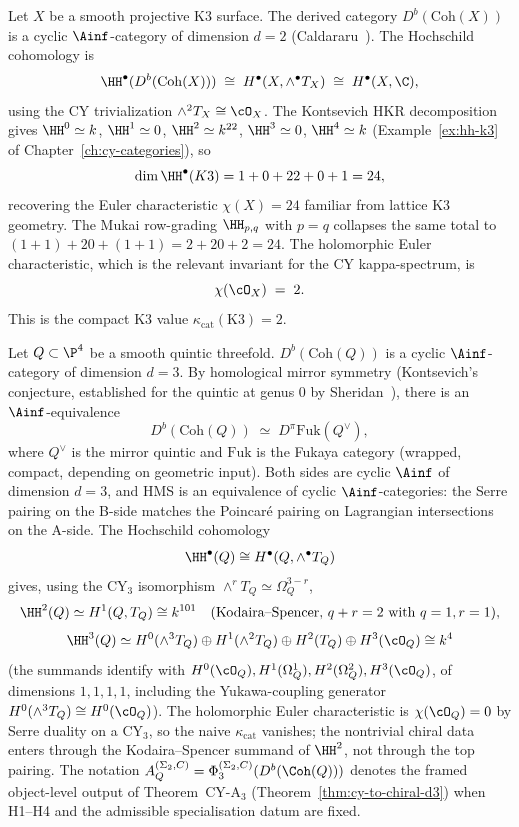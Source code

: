 \begin{example}[\texorpdfstring{$d = 2$}{d = 2} from K3]
\label{ex:cy2-k3}
Let $X$ be a smooth projective K3 surface. The derived category $D^b(\mathrm{Coh}(X))$ is a cyclic $\Ainf$-category of dimension $d = 2$ (Caldararu~\cite{Caldararu2005}). The Hochschild cohomology is
\[
 \HH^\bullet(D^b(\mathrm{Coh}(X))) \;\cong\; H^\bullet(X, \wedge^\bullet T_X) \;\cong\; H^\bullet(X, \C),
\]
using the CY trivialization $\wedge^2 T_X \cong \cO_X$. The Kontsevich HKR decomposition gives $\HH^0 \simeq k$, $\HH^1 \simeq 0$, $\HH^2 \simeq k^{22}$, $\HH^3 \simeq 0$, $\HH^4 \simeq k$ (Example~\ref{ex:hh-k3} of Chapter~\ref{ch:cy-categories}), so
\[
 \dim \HH^\bullet(K3) = 1 + 0 + 22 + 0 + 1 = 24,
\]
recovering the Euler characteristic $\chi(X) = 24$ familiar from lattice K3 geometry. The Mukai row-grading $\HH_{p,q}$ with $p = q$ collapses the same total to $(1+1) + 20 + (1+1) = 2 + 20 + 2 = 24$. The holomorphic Euler characteristic, which is the relevant invariant for the CY kappa-spectrum, is
\[
 \chi(\cO_X) \;=\; 2.
\]
This is the compact K3 value $\kappa_{\mathrm{cat}}(\mathrm{K3}) = 2$.
\end{example}

\begin{example}[\texorpdfstring{$d = 3$}{d = 3} from the quintic]
\label{ex:cy3-quintic}
Let $Q \subset \P^4$ be a smooth quintic threefold. $D^b(\mathrm{Coh}(Q))$ is a cyclic $\Ainf$-category of dimension $d = 3$. By homological mirror symmetry (Kontsevich's conjecture, established for the quintic at genus $0$ by Sheridan~\cite{Sheridan2015}), there is an $\Ainf$-equivalence
\[
 D^b(\mathrm{Coh}(Q)) \;\simeq\; D^\pi \mathrm{Fuk}(Q^\vee),
\]
where $Q^\vee$ is the mirror quintic and $\mathrm{Fuk}$ is the Fukaya category (wrapped, compact, depending on geometric input). Both sides are cyclic $\Ainf$ of dimension $d = 3$, and HMS is an equivalence of cyclic $\Ainf$-categories: the Serre pairing on the B-side matches the Poincar\'e pairing on Lagrangian intersections on the A-side. The Hochschild cohomology
\[
 \HH^\bullet(Q) \cong H^\bullet(Q, \wedge^\bullet T_Q)
\]
gives, using the CY$_3$ isomorphism $\wedge^r T_Q \simeq \Omega^{3-r}_Q$,
\[
 \HH^2(Q) \simeq H^1(Q, T_Q) \cong k^{101}
 \quad \text{(Kodaira--Spencer, $q+r = 2$ with $q=1,r=1$)},
\]
\[
 \HH^3(Q) \simeq H^0(\wedge^3 T_Q) \oplus H^1(\wedge^2 T_Q) \oplus H^2(T_Q) \oplus H^3(\cO_Q)
 \cong k^4
\]
(the summands identify with $H^0(\cO_Q), H^1(\Omega^1_Q), H^2(\Omega^2_Q), H^3(\cO_Q)$, of dimensions $1,1,1,1$, including the Yukawa-coupling generator $H^0(\wedge^3 T_Q) \cong H^0(\cO_Q)$). The holomorphic Euler characteristic is $\chi(\cO_Q) = 0$ by Serre duality on a CY$_3$, so the naive $\kappa_{\mathrm{cat}}$ vanishes; the nontrivial chiral data enters through the Kodaira--Spencer summand of $\HH^2$, not through the top pairing. The notation $A_Q^{(\Sigma_2,C)} = \Phi_3^{(\Sigma_2,C)}(D^b(\Coh(Q)))$ denotes the framed object-level output of Theorem~CY-A$_3$ (Theorem~\ref{thm:cy-to-chiral-d3}) when H1--H4 and the admissible specialisation datum are fixed.
\end{example}

